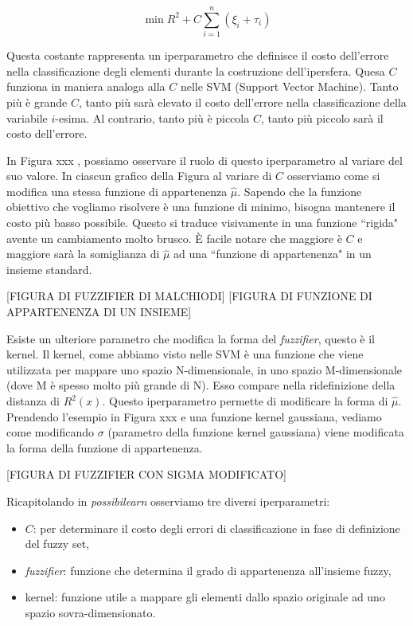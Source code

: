 \documentclass[12pt,italian]{report}
\begin{document}
\[ \min R^2 + C\sum_{i=1}^{n} (\xi_{i} + \tau_{i}) \]

Questa costante rappresenta un iperparametro che definisce il costo dell'errore nella classificazione degli elementi durante la costruzione dell'ipersfera. Quesa $ C$ funziona in maniera analoga alla $C$ nelle SVM (Support Vector Machine). Tanto più è grande $C$, tanto più sarà elevato il costo dell'errore nella classificazione della variabile $i$-esima. Al contrario, tanto più è piccola $C$, tanto più piccolo sarà il costo dell'errore. 

In Figura xxx%
, possiamo osservare il ruolo di questo iperparametro al variare del suo valore. In ciascun grafico della Figura al variare di $C$ osserviamo come si modifica una stessa funzione di appartenenza $\hat \mu$. 
Sapendo che la funzione obiettivo che vogliamo risolvere è una funzione di minimo, bisogna mantenere il costo più basso possibile. Questo si traduce visivamente in una funzione ``rigida" avente un cambiamento molto brusco. È facile notare che maggiore è $C$ e maggiore sarà la somiglianza di $\hat \mu$ ad una ``funzione di appartenenza" in un insieme standard.

[FIGURA DI FUZZIFIER DI MALCHIODI]
[FIGURA DI FUNZIONE DI APPARTENENZA DI UN INSIEME]


Esiste un ulteriore parametro che modifica la forma del \emph{fuzzifier}, questo è il kernel. Il kernel, come abbiamo visto nelle SVM è una funzione che viene utilizzata per mappare uno spazio N-dimensionale, in uno spazio M-dimensionale (dove M è spesso molto più grande di N). Esso compare nella ridefinizione della distanza di $ R^2(x) $. Questo iperparametro permette di modificare la forma di $\hat \mu$. Prendendo l'esempio in Figura xxx e una funzione kernel gaussiana, vediamo come modificando $\sigma$ (parametro della funzione kernel gaussiana) viene modificata la forma della funzione di appartenenza.

[FIGURA DI FUZZIFIER CON SIGMA MODIFICATO]

Ricapitolando in \emph{possibilearn} osserviamo tre diversi iperparametri:
\begin{itemize}
	\item $C$: per determinare il costo degli errori di classificazione in fase di definizione del fuzzy set,
	\item \emph{fuzzifier}: funzione che determina il grado di appartenenza all'insieme fuzzy,
	\item kernel: funzione utile a mappare gli elementi dallo spazio originale ad uno spazio sovra-dimensionato.
\end{itemize}
\end{document}
